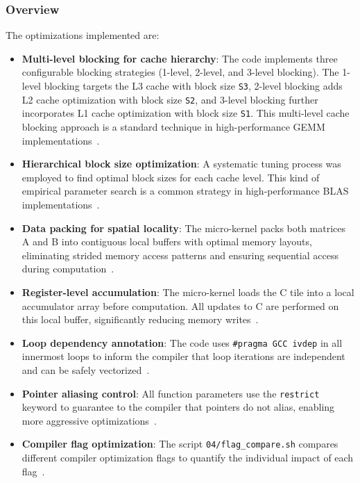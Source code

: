 \documentclass[unicode,10pt,a4paper,oneside,numbers=endperiod,openany]{scrartcl}
\begin{document}
\subsubsection{Overview}\label{sec:overview} 

The optimizations implemented are:

\begin{itemize}
\item \textbf{Multi-level blocking for cache hierarchy}: The code implements three configurable blocking strategies (1-level, 2-level, and 3-level blocking). The 1-level blocking targets the L3 cache with block size \texttt{S3}, 2-level blocking adds L2 cache optimization with block size \texttt{S2}, and 3-level blocking further incorporates L1 cache optimization with block size \texttt{S1}. This multi-level cache blocking approach is a standard technique in high-performance GEMM implementations~\cite{goto_gemm,blis_toms}.


\item \textbf{Hierarchical block size optimization}: A systematic tuning process was employed to find optimal block sizes for each cache level. This kind of empirical parameter search is a common strategy in high-performance BLAS implementations~\cite{atlas}.


\item \textbf{Data packing for spatial locality}: The micro-kernel packs both matrices A and B into contiguous local buffers with optimal memory layouts, eliminating strided memory access patterns and ensuring sequential access during computation~\cite{goto_gemm,blis_toms}.


\item \textbf{Register-level accumulation}: The micro-kernel loads the C tile into a local accumulator array before computation. All updates to C are performed on this local buffer, significantly reducing memory writes~\cite{goto_gemm,blis_toms}.


\item \textbf{Loop dependency annotation}: The code uses \texttt{\#pragma GCC ivdep} in all innermost loops to inform the compiler that loop iterations are independent and can be safely vectorized~\cite{gcc_manual}.


\item \textbf{Pointer aliasing control}: All function parameters use the \texttt{restrict} keyword to guarantee to the compiler that pointers do not alias, enabling more aggressive optimizations~\cite{gcc_manual}.


\item \textbf{Compiler flag optimization}: The script \texttt{04/flag\_compare.sh} compares different compiler optimization flags to quantify the individual impact of each flag~\cite{gcc_manual,atlas}.
\end{itemize}
\end{document}
